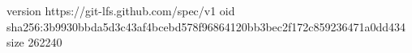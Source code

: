 version https://git-lfs.github.com/spec/v1
oid sha256:3b9930bbda5d3c43af4bcebd578f96864120bb3bec2f172c859236471a0dd434
size 262240
